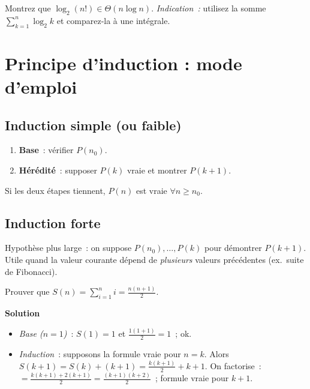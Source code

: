 \begin{exercice}
Montrez que $\displaystyle\log_2(n!)\in\Theta(n\log n)$.
\textit{Indication :} utilisez la somme $\sum_{k=1}^{n} \log_2 k$ et comparez‑la
à une intégrale.
\end{exercice}

\section{Principe d’induction : mode d’emploi}

\subsection{Induction simple (ou faible)}
\begin{enumerate}
  \item \textbf{Base} : vérifier $P(n_0)$.
  \item \textbf{Hérédité} : supposer $P(k)$ vraie et montrer $P(k+1)$.
\end{enumerate}
Si les deux étapes tiennent, $P(n)$ est vraie $\forall n\ge n_0$.

\subsection{Induction forte}
Hypothèse plus large : on suppose $P(n_0),\ldots,P(k)$ pour démontrer $P(k+1)$.
Utile quand la valeur courante dépend de \emph{plusieurs} valeurs précédentes
(ex. suite de Fibonacci).

\begin{exercice}
Prouver que $S(n)=\sum_{i=1}^{n} i = \frac{n(n+1)}{2}$.
\end{exercice}
\textbf{Solution}
\begin{itemize}
  \item \emph{Base ($n=1$)} : $S(1)=1$ et $\tfrac{1(1+1)}{2}=1$ ; ok.
  \item \emph{Induction} : supposons la formule vraie pour $n=k$.
        Alors $S(k+1)=S(k)+(k+1)=\frac{k(k+1)}{2}+k+1$.
        On factorise : $=\frac{k(k+1)+2(k+1)}{2}=\frac{(k+1)(k+2)}{2}$ ;
        formule vraie pour $k+1$. %
\end{itemize}

